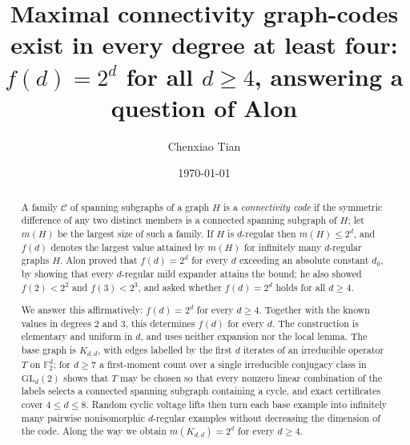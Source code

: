 \documentclass[11pt,reqno]{amsart}
\theoremstyle{plain}
\theoremstyle{definition}
\newcommand{\FF}{\mathbb{F}}
\newcommand{\GL}{\mathrm{GL}}
\begin{document}
\title[Maximal connectivity graph-codes in every degree at least four]
{Maximal connectivity graph-codes exist in every degree at least four:\\
$f(d)=2^{d}$ for all $d\ge 4$, answering a question of Alon}

\author{Chenxiao Tian}
\address{Princeton University, Princeton, NJ 08544, USA}

\date{\today}


\begin{abstract}
A family $\mathcal{C}$ of spanning subgraphs of a graph $H$ is a \emph{connectivity code} if the symmetric difference of any two distinct members is a connected spanning subgraph of $H$; let $m(H)$ be the largest size of such a family. If $H$ is $d$-regular then $m(H)\le 2^{d}$, and $f(d)$ denotes the largest value attained by $m(H)$ for infinitely many $d$-regular graphs $H$. Alon proved that $f(d)=2^{d}$ for every $d$ exceeding an absolute constant $d_{0}$, by showing that every $d$-regular mild expander attains the bound; he also showed $f(2)<2^{2}$ and $f(3)<2^{3}$, and asked whether $f(d)=2^{d}$ holds for all $d\ge 4$.

We answer this affirmatively: $f(d)=2^{d}$ for every $d\ge 4$. Together with the known values in degrees $2$ and $3$, this determines $f(d)$ for every $d$. The construction is elementary and uniform in $d$, and uses neither expansion nor the local lemma. The base graph is $K_{d,d}$, with edges labelled by the first $d$ iterates of an irreducible operator $T$ on $\FF_2^{d}$; for $d\ge 7$ a first-moment count over a single irreducible conjugacy class in $\GL_{d}(2)$ shows that $T$ may be chosen so that every nonzero linear combination of the labels selects a connected spanning subgraph containing a cycle, and exact certificates cover $4\le d\le 8$. Random cyclic voltage lifts then turn each base example into infinitely many pairwise nonisomorphic $d$-regular examples without decreasing the dimension of the code. Along the way we obtain $m(K_{d,d})=2^{d}$ for every $d\ge 4$.
\end{abstract}

\maketitle
\end{document}
